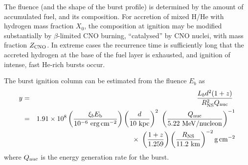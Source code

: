 \documentclass{aastex63}
\newcommand{\epc}{{\rm erg\,cm^{-2}}}
\newcommand{\qnuc}{Q_{\rm nuc}}
\newcommand{\opz}{1.259}
\begin{document}
The fluence (and the shape of the burst profile) is determined by the amount of accumulated fuel, and its composition. For accretion of mixed H/He with hydrogen mass fraction $X_0$, the composition at ignition may be modified substantially by $\beta$-limited CNO burning, ``catalysed'' by CNO nuclei, with mass fraction $Z_{\rm CNO}$. In extreme cases the recurrence time is sufficiently long that the accreted hydrogen at the base of the fuel layer is exhausted, and ignition of intense, fast He-rich bursts occur.

The burst ignition column can be estimated from the fluence $E_b$ as
\begin{eqnarray}
y & = & \frac{L_b d^2 (1+z)}{R_{\rm NS}^2 Q_{\rm nuc}}\ 
                                                            \nonumber \\
  & = & 1.91\times10^8 \left(\frac{\xi_b E_{\rm b}}{10^{-6}\ \epc}\right)
                      \left(\frac{d}{10\ {\rm kpc}}\right)^2\
             \left(\frac{Q_{\rm nuc}}{5.22\ {\rm MeV/nucleon}}\right)^{-1}
\nonumber \\ & & \times\  %
                      \left(\frac{1+z}{\opz}\right)
                      \left(\frac{R_{\rm NS}}{11.2\ {\rm km}}\right)^{-2}
                      {\rm g\,cm^{-2}}
\label{eq:column}
\end{eqnarray}
where $\qnuc$ is the energy generation rate for the burst.
\end{document}
